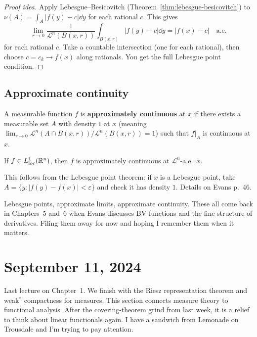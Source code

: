 \begin{proof}[Proof idea]
Apply Lebesgue--Besicovitch (Theorem~\ref{thm:lebesgue-besicovitch}) to
$\nu(A) = \int_A |f(y) - c| \dd y$ for each rational $c$. This gives
\[
  \lim_{r \to 0} \frac{1}{\mathcal{L}^n(B(x,r))} \int_{B(x,r)}
    |f(y) - c| \dd y = |f(x) - c| \quad \text{a.e.}
\]
for each rational $c$. Take a countable intersection (one for each
rational), then choose $c = c_k \to f(x)$ along rationals. You get the
full Lebesgue point condition. \qedhere
\end{proof}


\subsection{Approximate continuity}\label{subsec:approx-cont}

\begin{definition}\label{def:approx-cont}
A measurable function $f$ is \textbf{approximately continuous} at $x$ if
there exists a measurable set $A$ with density $1$ at $x$ (meaning
$\lim_{r \to 0}
\mathcal{L}^n(A \cap B(x,r)) / \mathcal{L}^n(B(x,r)) = 1$) such that
$f|_A$ is continuous at $x$.
\end{definition}

\begin{theorem}\label{thm:approx-cont}
If $f \in L^1_{\mathrm{loc}}(\mathbb{R}^n)$, then $f$ is approximately
continuous at $\mathcal{L}^n$-a.e.\ $x$.
\end{theorem}

This follows from the Lebesgue point theorem: if $x$ is a Lebesgue point,
take $A = \{y : |f(y) - f(x)| < \varepsilon\}$ and check it has density $1$.
Details on Evans p.\ 46.

Lebesgue points, approximate limits, approximate
continuity. These all come back in Chapters~5 and~6 when Evans
discusses BV functions and the fine structure of derivatives. Filing them away for now and hoping I remember them when it matters.


\section{September 11, 2024}\label{sec:lec5}

Last lecture on Chapter~1. We finish with the Riesz representation theorem
and weak$^*$ compactness for measures. This section connects measure theory to
functional analysis. After the covering-theorem grind from last week, it is a relief to think about linear functionals again. I have a sandwich from Lemonade on Trousdale and I'm trying to pay attention.


